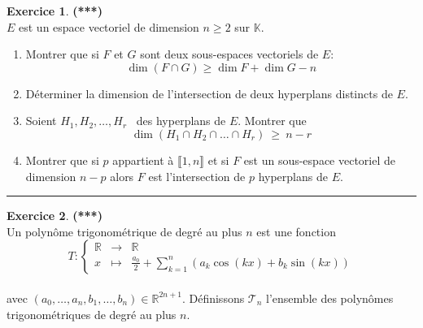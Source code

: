 \documentclass[a4paper,11pt]{article}
\theoremstyle{definition}
\newtheorem{exo}{Exercice} %
\begin{document}
\begin{minipage}{1\linewidth}\begin{minipage}[t]{0.48\linewidth}\raggedright
		
		
		\begin{exo}\textbf{(***)}\quad\\[0.2cm]
			$E$ est un espace vectoriel de dimension $n\geq 2$ sur $\mathbb{K}$.
		\begin{enumerate}
			\item  Montrer que si $F$ et $G$ sont deux sous-espaces vectoriels de $E$: $$\operatorname{dim}(F \cap G) \geqslant \operatorname{dim} F+\operatorname{dim} G-n$$
			\item Déterminer la dimension de l'intersection de deux hyperplans distincts de $E$.
			\item Soient $H_{1}, H_{2}, \ldots, H_{r}$ \ des hyperplans de $E$. Montrer que $$\operatorname{dim}\left(H_{1} \cap H_{2} \cap \ldots \cap H_{r}\right) \ \geqslant \  n-r$$
			\item Montrer que si $p$ appartient à $\llbracket 1, n \rrbracket$ et si $F$ est un sous-espace vectoriel de dimension $n-p$ alors $F$ est l'intersection de $p$ hyperplans de $E$.
		\end{enumerate}
			
			\centering\rule{1\linewidth}{0.6pt}\end{exo}
		
		
	\end{minipage}\hfill\vrule\hfill\begin{minipage}[t]{0.48\linewidth}\raggedright
		
		
		\begin{exo}\textbf{(***)}\quad\\[0.2cm]
		Un polynôme trigonométrique de degré au plus $n$ est une fonction\quad\\[-0.8cm]
		
		$$
		T:\left\{\begin{array}{rll}
		\mathbb{R} & \rightarrow & \mathbb{R} \\
		x & \mapsto & \frac{a_{0}}{2}+\sum_{k=1}^{n}\left(a_{k} \cos (k x)+b_{k} \sin (k x)\right)
		\end{array}\right.
		$$ \quad\\[-0.3cm]
		
		avec $\left(a_{0}, \ldots, a_{n}, b_{1}, \ldots, b_{n}\right) \in \mathbb{R}^{2 n+1}$. Définissons $\mathscr{T}_{n}$ l'ensemble des polynômes trigonométriques de degré au plus $n$.


\end{exo}
\end{minipage}
\end{minipage}
\end{document}
